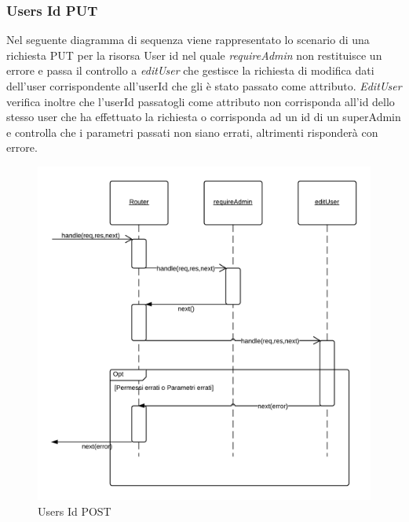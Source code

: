 \subsubsection{Users Id PUT} 
Nel seguente diagramma di sequenza viene rappresentato lo scenario di una richiesta PUT per la risorsa User id nel quale \emph{requireAdmin} non restituisce un errore e passa il controllo a \emph{editUser} che gestisce la richiesta di modifica dati dell'user corrispondente all'userId che gli è stato passato come attributo.
\emph{EditUser} verifica inoltre che l'userId passatogli come attributo non corrisponda all'id dello stesso user che ha effettuato la richiesta o corrisponda ad un id di un superAdmin e controlla che i parametri passati non siano errati, altrimenti risponderà con errore.
\begin{figure}[H]
	\begin{center} 
		\includegraphics[scale=0.20]{scenari/Users Id PUT.png} 
		\caption{Users Id POST}
	\end{center} 
\end{figure}

